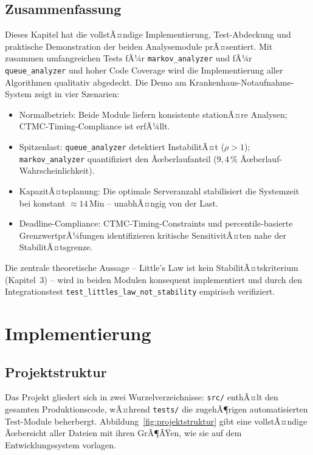 ﻿\documentclass[a4paper,12pt]{scrreprt}
\theoremstyle{definition}
\begin{document}
\subsection{Zusammenfassung}

Dieses Kapitel hat die vollstÃ¤ndige Implementierung, Test-Abdeckung und
praktische Demonstration der beiden Analysemodule prÃ¤sentiert.
Mit zusammen umfangreichen Tests fÃ¼r \texttt{markov\_analyzer} und fÃ¼r
\texttt{queue\_analyzer} und hoher Code Coverage wird die
Implementierung aller Algorithmen qualitativ abgedeckt. Die Demo am
Krankenhaus-Notaufnahme-System zeigt in vier Szenarien:

\begin{itemize}
	\item[-] Normalbetrieb: Beide Module liefern konsistente stationÃ¤re
	Analysen; CTMC-Timing-Compliance ist erfÃ¼llt.
	\item[-] Spitzenlast: \texttt{queue\_analyzer} detektiert InstabilitÃ¤t
	($\rho > 1$); \texttt{markov\_analyzer} quantifiziert den Ãœberlaufanteil
	($9{,}4\,\%$ Ãœberlauf-Wahrscheinlichkeit).
	\item[-] KapazitÃ¤tsplanung: Die optimale Serveranzahl stabilisiert
	die Systemzeit bei konstant $\approx 14$\,Min -- unabhÃ¤ngig von der Last.
	\item[-] Deadline-Compliance: CTMC-Timing-Constraints und percentile-basierte
	GrenzwertprÃ¼fungen identifizieren kritische SensitivitÃ¤ten nahe der
	StabilitÃ¤tsgrenze.
\end{itemize}

Die zentrale theoretische Aussage -- Little's Law ist kein StabilitÃ¤tskriterium
(Kapitel~3) -- wird in beiden Modulen konsequent implementiert und durch
den Integrationstest \texttt{test\_littles\_law\_not\_stability} empirisch
verifiziert.


\section{Implementierung}

\subsection{Projektstruktur}
\label{subsec:projektstruktur}

Das Projekt gliedert sich in zwei Wurzelverzeichnisse:
\texttt{src/} enthÃ¤lt den gesamten Produktionscode, wÃ¤hrend
\texttt{tests/} die zugehÃ¶rigen automatisierten Test-Module
beherbergt. Abbildung~\ref{fig:projektstruktur} gibt eine
vollstÃ¤ndige Ãœbersicht aller Dateien mit ihren GrÃ¶ÃŸen, wie
sie auf dem Entwicklungssystem vorlagen.
\end{document}
